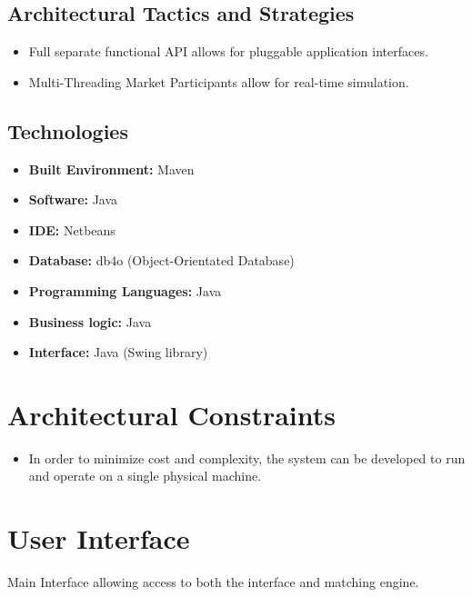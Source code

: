 \documentclass[12pt]{article}
\begin{document}
                \subsection{Architectural Tactics and Strategies} 
                    \begin{itemize}
                        \item Full separate functional API allows for pluggable application interfaces.
                        \item Multi-Threading Market Participants allow for real-time simulation.
                    \end{itemize}

                \subsection{Technologies}
                    \begin{itemize}
                        \item \textbf{Built Environment:} Maven
                        \item \textbf{Software:} Java
                        \item \textbf{IDE:} Netbeans
                        \item \textbf{Database:} db4o (Object-Orientated Database)
                        \item \textbf{Programming Languages:} Java
                        \item \textbf{Business logic:} Java
                        \item \textbf{Interface:} Java (Swing library)
                    \end{itemize}

		\section{Architectural Constraints}
		\begin{itemize}
		\item In order to minimize cost and complexity, the system can be developed to run and operate on a single physical machine. 
		\end{itemize}

        \newpage
	\section{User Interface}
           Main Interface allowing access to both the interface and matching engine.
            
\end{document}
